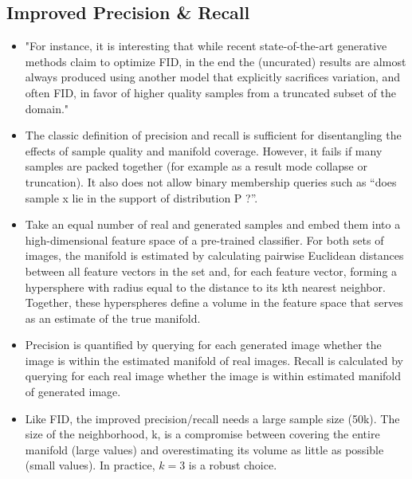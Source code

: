 \documentclass{article}
\begin{document}
\subsection{Improved Precision \& Recall}
\begin{itemize}
    \item "For instance, it is interesting that while recent state-of-the-art generative methods claim to optimize FID, in the end the (uncurated) results are almost always produced using another model that explicitly sacrifices variation, and often FID, in favor of higher quality samples from a truncated subset of the domain."
    \item The classic definition of precision and recall is sufficient for disentangling the effects of sample quality and manifold coverage. However, it fails if many samples are packed together (for example as a result mode collapse or truncation). It also does not allow binary membership queries such as “does sample x lie in the support of distribution P ?”.
    \item Take an equal number of real and generated samples and embed them into a high-dimensional feature space of a pre-trained classifier. For both sets of images, the manifold is estimated by calculating pairwise Euclidean distances between all feature vectors in the set and, for each feature vector, forming a hypersphere with radius equal to the distance to its kth nearest neighbor. Together, these hyperspheres define a volume in the feature space that serves as an estimate of the true manifold.
    \item Precision is quantified by querying for each generated image whether the image is within the estimated manifold of real images. Recall is calculated by querying for each real image whether the image is within estimated manifold of generated image.
    \item Like FID, the improved precision/recall needs a large sample size (50k). The size of the neighborhood, k, is a compromise between covering the entire manifold (large values) and overestimating its volume as little as possible (small values). In practice, $k = 3$ is a robust choice.
\end{itemize}
\end{document}

